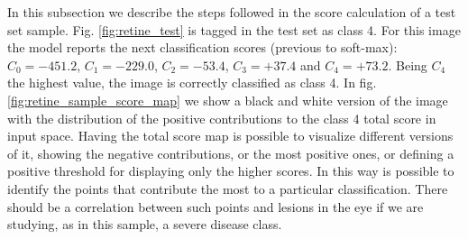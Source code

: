 \documentclass[review]{elsarticle}
\theoremstyle{definition} %
\theoremstyle{remark}
\begin{document}
In this subsection we describe the steps followed in the score calculation of a test set sample. Fig. \ref{fig:retine_test} is tagged in the test set as class 4. For this image the model reports the next classification scores (previous to soft-max): $C_0 = -451.2$, $C_1 = -229.0$, $C_2 = -53.4$, $C_3 = +37.4$ and $C_4 = +73.2$. Being $C_4$ the highest value, the image is correctly classified as class 4. In fig. \ref{fig:retine_sample_score_map} we show a black and white version of the image with the distribution of the positive contributions to the class 4 total score in input space. Having the total score map is possible to visualize different versions of it, showing the negative contributions, or the most positive ones, or defining a positive threshold for displaying only the higher scores. In this way is possible to identify the points that contribute the most to a particular classification. There should be a correlation between such points and lesions in the eye if we are studying, as in this sample, a severe disease class.
\end{document}
